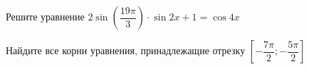 \begin{ex}
	\begin{condition}
		\begin{enumcols}[label=\asbuk*)]
			\item Решите уравнение \( 2\sin {\left(\dfrac{19\pi}{3}\right)}\cdot\sin 2x +1 = \cos 4x \)
			\item Найдите все корни уравнения, принадлежащие отрезку \( \left[-\dfrac{7\pi}{2};-\dfrac{5\pi}{2}\right]  \)
		\end{enumcols}
	\end{condition}
\end{ex}